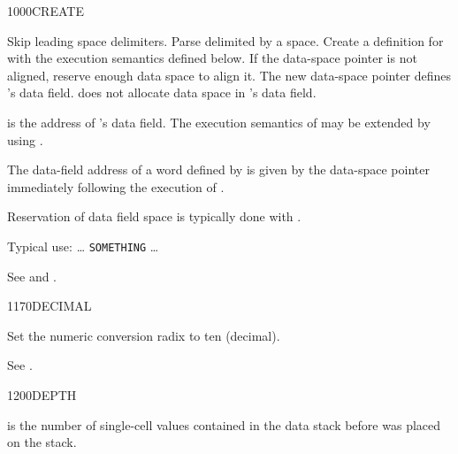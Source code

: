 \vspace*{-1ex}
\begin{worddef}{1000}{CREATE}
\item {}

	Skip leading space delimiters. Parse  delimited by a
	space. Create a definition for  with the execution
	semantics defined below. If the data-space pointer is not
	aligned, reserve enough data space to align it. The new
	data-space pointer defines 's data field.
	 does not allocate data space in 's
	data field.

\execute[name]

	 is the address of 's data field.
	The execution semantics of  may be extended by
	using .


	\begin{rationale} %
		The data-field address of a word defined by  is
		given by the data-space pointer immediately following the
		execution of .

		Reservation of data field space is typically done with
		.

		Typical use: {\ldots}
			 \texttt{SOMETHING} {\ldots}
	\end{rationale}

	\begin{testing} %
		See  and
			.
	\end{testing}
\end{worddef}

\vspace*{-1ex}\enlargethispage{10ex}
\begin{worddef}{1170}{DECIMAL}
\item \stack{}{}

	Set the numeric conversion radix to ten (decimal).

	\begin{testing} %
		See .
	\end{testing}
\end{worddef}

\vspace*{-1ex}
\begin{worddef}{1200}{DEPTH}
\item {}

	 is the number of single-cell values contained in the
	data stack before  was placed on the stack.

	\begin{testing} %
		 \\
		 \\
	\end{testing}
\end{worddef}


